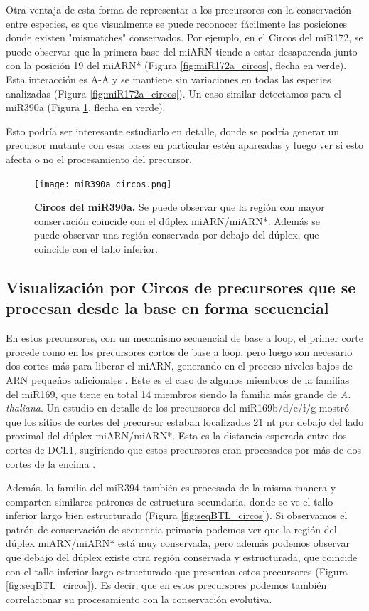 Otra ventaja de esta forma de representar a los precursores con la conservación entre especies, es que visualmente se puede reconocer fácilmente las posiciones donde existen "mismatches" conservados. 
Por ejemplo, en el Circos del miR172, se puede observar que la primera base del miARN tiende a estar desapareada junto con la posición 19 del miARN* (Figura \ref{fig:miR172a_circos}, flecha en verde). 
Esta interacción es A-A y se mantiene sin variaciones en todas las especies analizadas (Figura \ref{fig:miR172a_circos}).
Un caso similar detectamos para el miR390a (Figura \ref{fig:miR390a_circos}, flecha en verde).

Esto podría ser interesante estudiarlo en detalle, donde se podría generar un precursor mutante con esas bases en particular estén apareadas y luego ver si esto afecta o no el procesamiento del precursor.  


\begin{figure}[htbp!] 
    \centering    
    \texttt{[image: miR390a\_circos.png]}
    \caption[Circos del miR172a]{
    \textbf{Circos del miR390a.}
    Se puede observar que la región con mayor conservación coincide con el dúplex miARN/miARN*.
    Además se puede observar una región conservada por debajo del dúplex, que coincide con el tallo inferior.
    }
     \label{fig:miR390a_circos}
\end{figure}

\subsection{Visualización por Circos de precursores que se procesan desde la base en forma secuencial}

En estos precursores, con un mecanismo secuencial de base a loop, el primer corte procede como en los precursores cortos de base a loop, pero luego son necesario dos cortes más para liberar el miARN, generando en el proceso niveles bajos de ARN pequeños adicionales \citep{Bologna2013}.
Este es el caso de algunos miembros de la  familias del miR169, que tiene en total 14 miembros siendo la familia más grande de \textit{A. thaliana}.
Un estudio en detalle de los precursores del miR169b/d/e/f/g mostró que los sitios de cortes del precursor estaban localizados 21 nt por debajo del lado proximal del dúplex miARN/miARN*.
Esta es la distancia esperada entre dos cortes de DCL1, sugiriendo que estos precursores eran procesados por más de dos cortes de la encima \citep{Bologna2013}.

Además. la familia del miR394 también es procesada de la misma manera y comparten similares patrones de estructura secundaria, donde se ve el tallo inferior largo bien estructurado (Figura \ref{fig:seqBTL_circos}).
Si observamos el patrón de conservación de secuencia primaria podemos ver que la región del dúplex miARN/miARN* está muy conservada, pero además podemos observar que debajo del dúplex existe otra región conservada y estructurada, que coincide con el tallo inferior largo estructurado que presentan estos precursores (Figura \ref{fig:seqBTL_circos}).
Es decir, que en estos precursores podemos también correlacionar su procesamiento con la conservación evolutiva.

